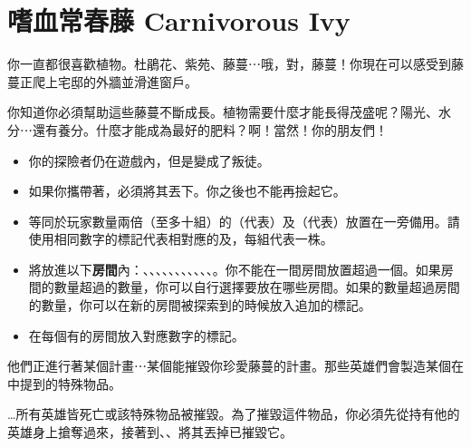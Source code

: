 
\chapter{嗜血常春藤 Carnivorous Ivy}

\begin{HauntStory}
  你一直都很喜歡植物。杜鵑花、紫苑、藤蔓⋯哦，對，藤蔓！你現在可以感受到藤蔓正爬上宅邸的外牆並滑進窗戶。

  你知道你必須幫助這些藤蔓不斷成長。植物需要什麼才能長得茂盛呢？陽光、水分⋯還有養分。什麼才能成為最好的肥料？啊！當然！你的朋友們！
\end{HauntStory}

\vspace*{-1em}
\begin{itemize}
  \item 你的探險者仍在遊戲內，但是變成了叛徒。
  \item 如果你攜帶著，必須將其丟下。你之後也不能再撿起它。
  \item 等同於玩家數量兩倍（至多十組）的（代表）及（代表）放置在一旁備用。請使用相同數字的標記代表相對應的及，每組代表一株。
  \item 將放進以下\textbf{房間}內：、、、、、、、、、、、。你不能在一間房間放置超過一個。如果房間的數量超過的數量，你可以自行選擇要放在哪些房間。如果的數量超過房間的數量，你可以在新的房間被探索到的時候放入追加的標記。
  \item 在每個有的房間放入對應數字的標記。
\end{itemize}

他們正進行著某個計畫⋯某個能摧毀你珍愛藤蔓的計畫。那些英雄們會製造某個在中提到的特殊物品。

…所有英雄皆死亡或該特殊物品被摧毀。為了摧毀這件物品，你必須先從持有他的英雄身上搶奪過來，接著到、、將其丟掉已摧毀它。

\vfill\null\pagebreak

